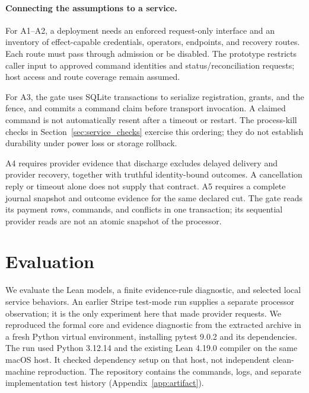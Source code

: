 \documentclass[letterpaper]{article}
\begin{document}
\paragraph{Connecting the assumptions to a service.}
For A1--A2, a deployment needs an enforced request-only interface and an inventory
of effect-capable credentials, operators, endpoints, and recovery routes. Each
route must pass through admission or be disabled. The prototype restricts caller
input to approved command identities and status/reconciliation requests; host access and route
coverage remain assumed.

For A3, the gate uses SQLite transactions to serialize registration, grants,
and the fence, and commits a command claim before transport invocation. A
claimed command is not automatically resent after a timeout or restart. The
process-kill checks in Section~\ref{sec:service_checks} exercise this ordering;
they do not establish durability under power loss or storage rollback.

A4 requires provider evidence that discharge excludes delayed delivery and
provider recovery, together with truthful identity-bound outcomes. A cancellation
reply or timeout alone does not supply that contract. A5 requires a complete
journal snapshot and outcome evidence for the same declared cut. The gate reads
its payment rows, commands, and conflicts in one transaction; its sequential
provider reads are not an atomic snapshot of the processor.

\section{Evaluation}
\label{sec:eval}
We evaluate the Lean models, a finite evidence-rule diagnostic, and selected
local service behaviors. An earlier Stripe test-mode run supplies a separate
processor observation; it is the only experiment here that made provider
requests. We reproduced the formal core and evidence diagnostic from the
extracted archive in a fresh Python virtual environment, installing pytest
9.0.2 and its dependencies. The run used Python 3.12.14 and the existing Lean
4.19.0 compiler on the same macOS host. It checked dependency setup on that host,
not independent clean-machine reproduction. The repository contains the
commands, logs, and separate implementation test history
(Appendix~\ref{app:artifact}).
\end{document}
